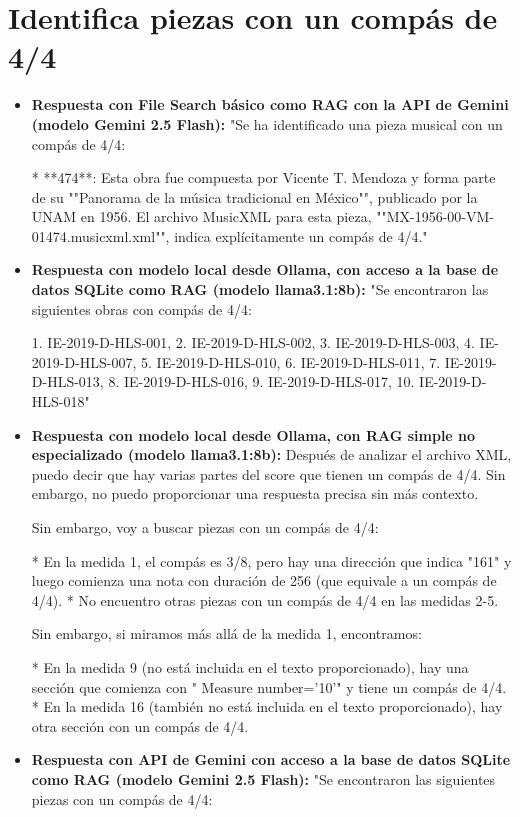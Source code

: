\section{Identifica piezas con un compás de 4/4}
\begin{itemize}
    \item \textbf{Respuesta con File Search básico como RAG con la API de Gemini (modelo Gemini 2.5 Flash):} "Se ha identificado una pieza musical con un compás de 4/4:

*   **474**: Esta obra fue compuesta por Vicente T. Mendoza y forma parte de su ""Panorama de la música tradicional en México"", publicado por la UNAM en 1956. El archivo MusicXML para esta pieza, ""MX-1956-00-VM-01474.musicxml.xml"", indica explícitamente un compás de 4/4."
    \item \textbf{Respuesta con modelo local desde Ollama, con acceso a la base de datos SQLite como RAG (modelo llama3.1:8b):} "Se encontraron las siguientes obras con compás de 4/4: 

1. IE-2019-D-HLS-001,
2. IE-2019-D-HLS-002,
3. IE-2019-D-HLS-003,
4. IE-2019-D-HLS-007,
5. IE-2019-D-HLS-010,
6. IE-2019-D-HLS-011,
7. IE-2019-D-HLS-013,
8. IE-2019-D-HLS-016,
9. IE-2019-D-HLS-017,
10. IE-2019-D-HLS-018"
    \item \textbf{Respuesta con modelo local desde Ollama, con RAG simple no especializado (modelo llama3.1:8b):} Después de analizar el archivo XML, puedo decir que hay varias partes del score que tienen un compás de 4/4. Sin embargo, no puedo proporcionar una respuesta precisa sin más contexto.

Sin embargo, voy a buscar piezas con un compás de 4/4:

* En la medida 1, el compás es 3/8, pero hay una dirección que indica "161" y luego comienza una nota con duración de 256 (que equivale a un compás de 4/4).
* No encuentro otras piezas con un compás de 4/4 en las medidas 2-5.

Sin embargo, si miramos más allá de la medida 1, encontramos:

* En la medida 9 (no está incluida en el texto proporcionado), hay una sección que comienza con " Measure number='10'" y tiene un compás de 4/4.
* En la medida 16 (también no está incluida en el texto proporcionado), hay otra sección con un compás de 4/4.
    \item \textbf{Respuesta con API de Gemini con acceso a la base de datos SQLite como RAG (modelo Gemini 2.5 Flash):} "Se encontraron las siguientes piezas con un compás de 4/4:


\end{itemize}
